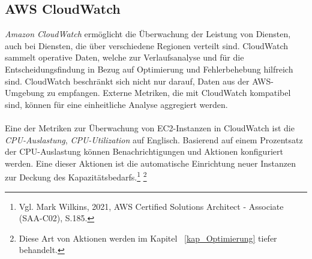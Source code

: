 \subsection{AWS CloudWatch}\label{ssec:CloudWatch}
\textit{Amazon CloudWatch} ermöglicht die Überwachung der Leistung von Diensten, auch bei Diensten, die über verschiedene Regionen verteilt sind. CloudWatch sammelt operative Daten, welche zur Verlaufsanalyse und für die Entscheidungsfindung in Bezug auf Optimierung und Fehlerbehebung hilfreich sind. CloudWatch beschränkt sich nicht nur darauf, Daten aus der AWS-Umgebung zu empfangen. Externe Metriken, die mit CloudWatch kompatibel sind, können für eine einheitliche Analyse aggregiert werden. 
\\\\
Eine der Metriken zur Überwachung von EC2-Instanzen in CloudWatch ist die \textit{CPU-Auslastung}, \textit{CPU-Utilization} auf Englisch. Basierend auf einem Prozentsatz der CPU-Auslastung können Benachrichtigungen und Aktionen konfiguriert werden. Eine dieser Aktionen ist die automatische Einrichtung neuer Instanzen zur Deckung des Kapazitätsbedarfs.\footnote{Vgl. Mark Wilkins, 2021, AWS Certified Solutions Architect - Associate (SAA-C02), S.185.\cite{AWS1}} \footnote{Diese Art von Aktionen werden im Kapitel ~\ref{kap_Optimierung} tiefer behandelt.}
